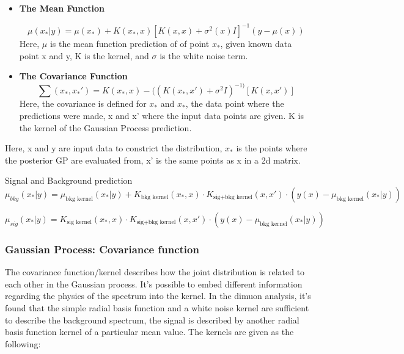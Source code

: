     \begin{itemize}

        \item \textbf{The Mean Function}

    \begin{equation}
        \mu(x_{*}|y)  = \mu(x_{*})+ K(x_{*}, x)[K(x, x)+ \sigma^{2}(x)I]^{-1}(y-\mu(x))
    \end{equation}
    Here, $\mu$ is the mean function prediction of of point $x_{*}$, given known data point x and y, K is the kernel, and $\sigma$ is the white noise term.

    \item \textbf{The Covariance Function}
    \begin{equation}
        \sum(x_{*}, x_{*}') = K(x_{*}, x) - ((K(x_{*}, x')+\sigma^{2}I)^{-1)}[K(x, x')]
    \end{equation}  
    Here, the covariance is defined for $x_{*}$ and $x_{*}$, the data point where the predictions were made, x and x' where the input data points are given. K is the kernel of the Gaussian Process prediction.

    \end{itemize}

    Here, x and y are input data to constrict the distribution, $x_{*}$ is the points where the posterior GP are evaluated from, x' is the same points as x in a 2d matrix.

    Signal and Background prediction 
    \begin{equation}
        \mu_{bkg}(x_{*}|y) = \mu_{\textrm{bkg kernel}}(x_{*}|y)+K_{\textrm{bkg kernel}}(x_{*}, x) \cdot K_{\textrm{sig+bkg kernel}}(x,x') \cdot( y(x)-\mu_{\textrm{bkg kernel}}(x_{*}|y) )
    \end{equation}


    \begin{equation}
        \mu_{sig}(x_{*}|y) = K_{\textrm{sig kernel}}(x_{*}, x)\cdot K_{\textrm{sig+bkg kernel}}(x,x') \cdot ( y(x)-\mu_{\textrm{bkg kernel}}(x_{*}|y) )
    \end{equation}


\subsubsection{Gaussian Process: Covariance function}
\label{sec:kernel}
The covariance function/kernel describes how the joint distribution is related to each other in the Gaussian process. 
It's possible to embed different information regarding the physics of the spectrum into the kernel. 
In the dimuon analysis, it's found that the simple radial basis function and a white noise kernel are sufficient to describe the background spectrum, the signal is described by another radial basis function kernel of a particular mean value.
The kernels are given as the following: 

